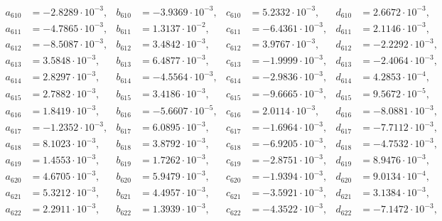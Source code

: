 \begin{align*}
  a_{ 610 } &= -2.8289 \cdot 10^{ -3 }, & b_{ 610 } &= -3.9369 \cdot 10^{ -3 }, & c_{ 610 } &= 5.2332 \cdot 10^{ -3 }, & d_{ 610 } &= 2.6672 \cdot 10^{ -3 }, \\ 
  a_{ 611 } &= -4.7865 \cdot 10^{ -3 }, & b_{ 611 } &= 1.3137 \cdot 10^{ -2 }, & c_{ 611 } &= -6.4361 \cdot 10^{ -3 }, & d_{ 611 } &= 2.1146 \cdot 10^{ -3 }, \\ 
  a_{ 612 } &= -8.5087 \cdot 10^{ -3 }, & b_{ 612 } &= 3.4842 \cdot 10^{ -3 }, & c_{ 612 } &= 3.9767 \cdot 10^{ -3 }, & d_{ 612 } &= -2.2292 \cdot 10^{ -3 }, \\ 
  a_{ 613 } &= 3.5848 \cdot 10^{ -3 }, & b_{ 613 } &= 6.4877 \cdot 10^{ -3 }, & c_{ 613 } &= -1.9999 \cdot 10^{ -3 }, & d_{ 613 } &= -2.4064 \cdot 10^{ -3 }, \\ 
  a_{ 614 } &= 2.8297 \cdot 10^{ -3 }, & b_{ 614 } &= -4.5564 \cdot 10^{ -3 }, & c_{ 614 } &= -2.9836 \cdot 10^{ -3 }, & d_{ 614 } &= 4.2853 \cdot 10^{ -4 }, \\ 
  a_{ 615 } &= 2.7882 \cdot 10^{ -3 }, & b_{ 615 } &= 3.4186 \cdot 10^{ -3 }, & c_{ 615 } &= -9.6665 \cdot 10^{ -3 }, & d_{ 615 } &= 9.5672 \cdot 10^{ -5 }, \\ 
  a_{ 616 } &= 1.8419 \cdot 10^{ -3 }, & b_{ 616 } &= -5.6607 \cdot 10^{ -5 }, & c_{ 616 } &= 2.0114 \cdot 10^{ -3 }, & d_{ 616 } &= -8.0881 \cdot 10^{ -3 }, \\ 
  a_{ 617 } &= -1.2352 \cdot 10^{ -3 }, & b_{ 617 } &= 6.0895 \cdot 10^{ -3 }, & c_{ 617 } &= -1.6964 \cdot 10^{ -3 }, & d_{ 617 } &= -7.7112 \cdot 10^{ -3 }, \\ 
  a_{ 618 } &= 8.1023 \cdot 10^{ -3 }, & b_{ 618 } &= 3.8792 \cdot 10^{ -3 }, & c_{ 618 } &= -6.9205 \cdot 10^{ -3 }, & d_{ 618 } &= -4.7532 \cdot 10^{ -3 }, \\ 
  a_{ 619 } &= 1.4553 \cdot 10^{ -3 }, & b_{ 619 } &= 1.7262 \cdot 10^{ -3 }, & c_{ 619 } &= -2.8751 \cdot 10^{ -3 }, & d_{ 619 } &= 8.9476 \cdot 10^{ -3 }, \\ 
  a_{ 620 } &= 4.6705 \cdot 10^{ -3 }, & b_{ 620 } &= 5.9479 \cdot 10^{ -3 }, & c_{ 620 } &= -1.9394 \cdot 10^{ -3 }, & d_{ 620 } &= 9.0134 \cdot 10^{ -4 }, \\ 
  a_{ 621 } &= 5.3212 \cdot 10^{ -3 }, & b_{ 621 } &= 4.4957 \cdot 10^{ -3 }, & c_{ 621 } &= -3.5921 \cdot 10^{ -3 }, & d_{ 621 } &= 3.1384 \cdot 10^{ -3 }, \\ 
  a_{ 622 } &= 2.2911 \cdot 10^{ -3 }, & b_{ 622 } &= 1.3939 \cdot 10^{ -3 }, & c_{ 622 } &= -4.3522 \cdot 10^{ -3 }, & d_{ 622 } &= -7.1472 \cdot 10^{ -3 }, \\ 

\end{align*}
